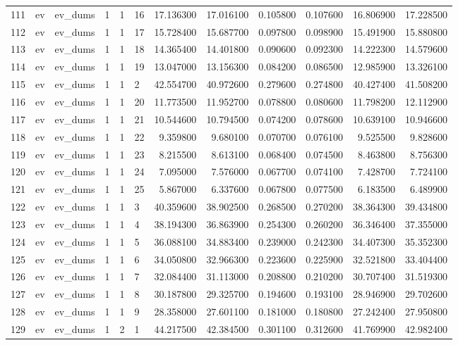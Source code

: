 \begin{tabular}{llllllrrrrrr}
111 & ev & ev_dums & 1 & 1 & 16 & 17.136300 & 17.016100 & 0.105800 & 0.107600 & 16.806900 & 17.228500 \\
112 & ev & ev_dums & 1 & 1 & 17 & 15.728400 & 15.687700 & 0.097800 & 0.098900 & 15.491900 & 15.880800 \\
113 & ev & ev_dums & 1 & 1 & 18 & 14.365400 & 14.401800 & 0.090600 & 0.092300 & 14.222300 & 14.579600 \\
114 & ev & ev_dums & 1 & 1 & 19 & 13.047000 & 13.156300 & 0.084200 & 0.086500 & 12.985900 & 13.326100 \\
115 & ev & ev_dums & 1 & 1 & 2 & 42.554700 & 40.972600 & 0.279600 & 0.274800 & 40.427400 & 41.508200 \\
116 & ev & ev_dums & 1 & 1 & 20 & 11.773500 & 11.952700 & 0.078800 & 0.080600 & 11.798200 & 12.112900 \\
117 & ev & ev_dums & 1 & 1 & 21 & 10.544600 & 10.794500 & 0.074200 & 0.078600 & 10.639100 & 10.946600 \\
118 & ev & ev_dums & 1 & 1 & 22 & 9.359800 & 9.680100 & 0.070700 & 0.076100 & 9.525500 & 9.828600 \\
119 & ev & ev_dums & 1 & 1 & 23 & 8.215500 & 8.613100 & 0.068400 & 0.074500 & 8.463800 & 8.756300 \\
120 & ev & ev_dums & 1 & 1 & 24 & 7.095000 & 7.576000 & 0.067700 & 0.074100 & 7.428700 & 7.724100 \\
121 & ev & ev_dums & 1 & 1 & 25 & 5.867000 & 6.337600 & 0.067800 & 0.077500 & 6.183500 & 6.489900 \\
122 & ev & ev_dums & 1 & 1 & 3 & 40.359600 & 38.902500 & 0.268500 & 0.270200 & 38.364300 & 39.434800 \\
123 & ev & ev_dums & 1 & 1 & 4 & 38.194300 & 36.863900 & 0.254300 & 0.260200 & 36.346400 & 37.355000 \\
124 & ev & ev_dums & 1 & 1 & 5 & 36.088100 & 34.883400 & 0.239000 & 0.242300 & 34.407300 & 35.352300 \\
125 & ev & ev_dums & 1 & 1 & 6 & 34.050800 & 32.966300 & 0.223600 & 0.225900 & 32.521800 & 33.404400 \\
126 & ev & ev_dums & 1 & 1 & 7 & 32.084400 & 31.113000 & 0.208800 & 0.210200 & 30.707400 & 31.519300 \\
127 & ev & ev_dums & 1 & 1 & 8 & 30.187800 & 29.325700 & 0.194600 & 0.193100 & 28.946900 & 29.702600 \\
128 & ev & ev_dums & 1 & 1 & 9 & 28.358000 & 27.601100 & 0.181000 & 0.180800 & 27.242400 & 27.950800 \\
129 & ev & ev_dums & 1 & 2 & 1 & 44.217500 & 42.384500 & 0.301100 & 0.312600 & 41.769900 & 42.982400 \\

\end{tabular}
